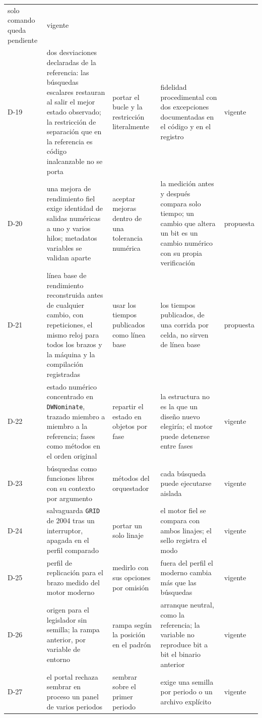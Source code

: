 \begin{longtable}{L{0.8cm}L{3.5cm}L{2.7cm}L{3.2cm}L{1.85cm}}
solo comando queda pendiente & vigente \\
D-19 & dos desviaciones declaradas de la referencia: las búsquedas escalares restauran al
salir el mejor estado observado; la restricción de separación que en la referencia es
código inalcanzable no se porta & portar el bucle y la restricción literalmente & fidelidad
procedimental con dos excepciones documentadas en el código y en el registro & vigente \\
D-20 & una mejora de rendimiento fiel exige identidad de salidas numéricas a uno y varios
hilos; metadatos variables se validan aparte & aceptar mejoras dentro de
una tolerancia numérica & la medición antes y después compara solo tiempo; un cambio que
altera un bit es un cambio numérico con su propia verificación & propuesta \\
D-21 & línea base de rendimiento reconstruida antes de cualquier cambio, con repeticiones,
el mismo reloj para todos los brazos y la máquina y la compilación registradas & usar los
tiempos publicados como línea base & los tiempos publicados, de una corrida por celda, no
sirven de línea base & propuesta \\
\addlinespace
D-22 & estado numérico concentrado en \texttt{DWNominate}, trazado miembro a miembro a la
referencia; fases como métodos en el orden original & repartir el estado en objetos por fase
& la estructura no es la que un diseño nuevo elegiría; el motor puede detenerse entre fases &
vigente \\
D-23 & búsquedas como funciones libres con su contexto por argumento & métodos del
orquestador & cada búsqueda puede ejecutarse aislada & vigente \\
D-24 & salvaguarda \texttt{GRID} de 2004 tras un interruptor, apagada en el perfil comparado &
portar un solo linaje & el motor fiel se compara con ambos linajes; el sello registra el modo
& vigente \\
D-25 & perfil de replicación para el brazo medido del motor moderno & medirlo con sus opciones
por omisión & fuera del perfil el moderno cambia más que las búsquedas & vigente \\
D-26 & origen para el legislador sin semilla; la rampa anterior, por variable de entorno &
rampa según la posición en el padrón & arranque neutral, como la referencia; la variable no
reproduce bit a bit el binario anterior & vigente \\
D-27 & el portal rechaza sembrar en proceso un panel de varios periodos & sembrar sobre el
primer periodo & exige una semilla por periodo o un archivo explícito & vigente \\

\end{longtable}
